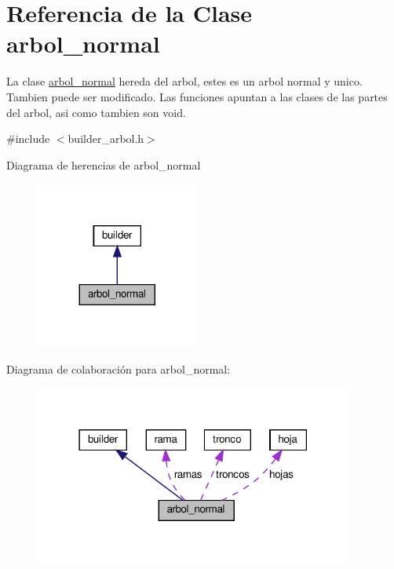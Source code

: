 \hypertarget{classarbol__normal}{}\section{Referencia de la Clase arbol\+\_\+normal}
\label{classarbol__normal}


La clase \hyperlink{classarbol__normal}{arbol\+\_\+normal} hereda del arbol, estes es un arbol normal y unico. Tambien puede ser modificado.  Las funciones apuntan a las clases de las partes del arbol, asi como tambien son void.  




{\ttfamily \#include $<$builder\+\_\+arbol.\+h$>$}



Diagrama de herencias de arbol\+\_\+normal
\nopagebreak
\begin{figure}[H]
\begin{center}
\leavevmode
\includegraphics[width=152pt]{classarbol__normal__inherit__graph}
\end{center}
\end{figure}


Diagrama de colaboración para arbol\+\_\+normal\+:
\nopagebreak
\begin{figure}[H]
\begin{center}
\leavevmode
\includegraphics[width=297pt]{classarbol__normal__coll__graph}
\end{center}
\end{figure}
